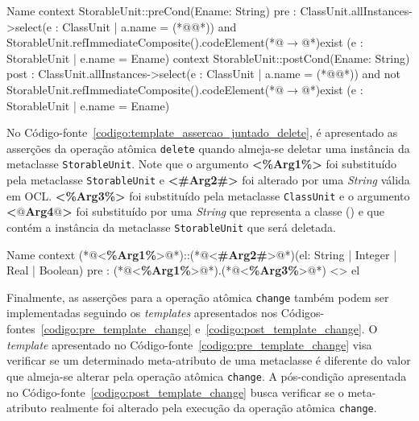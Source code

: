 \begin{codigo}[caption={[Asserções em OCL para realizar a operação atômica \texttt{delete}.] Asserções em OCL para realizar a operação atômica \texttt{delete}.},escapeinside={(*@}{@*)}, basicstyle=\footnotesize, label={codigo:template_assercao_juntado_delete}, language=OCL]{Name}
context StorableUnit::preCond(Ename: String)
pre : ClassUnit.allInstances->select(e : ClassUnit | a.name = (*@@*)) and StorableUnit.refImmediateComposite().codeElement(*@$\rightarrow$@*)exist (e : StorableUnit | e.name = Ename)
context StorableUnit::postCond(Ename: String)
post : ClassUnit.allInstances->select(e : ClassUnit | a.name = (*@@*)) and  not StorableUnit.refImmediateComposite().codeElement(*@$\rightarrow$@*)exist (e : StorableUnit | e.name = Ename)
\end{codigo}

No Código-fonte~\ref{codigo:template_assercao_juntado_delete}, é apresentado as asserções da operação atômica \texttt{delete} quando almeja-se deletar uma instância da metaclasse \texttt{StorableUnit}. Note que o argumento \textbf{<\%Arg1\%>} foi substituído pela metaclasse \texttt{StorableUnit} e \textbf{<\#Arg2\#>} foi alterado por uma \textit{String} válida em OCL. \textbf{<\%Arg3\%>} foi substituído pela metaclasse \texttt{ClassUnit} e o argumento \textbf{<$@$Arg4$@$>} foi  substituído por uma \textit{String} que representa a classe () e que contém a instância da metaclasse \texttt{StorableUnit} que será deletada. 

\begin{codigo}[caption={[\textit{Template} OCL para realizar a pré-condição da operação atômica \texttt{change}.] \textit{Template} OCL para realizar a pré-condição da operação atômica \texttt{change}.},escapeinside={(*@}{@*)}, mathescape=true, basicstyle=\footnotesize, label={codigo:pre_template_change}, language=OCL]{Name}
context (*@<\textbf{\%Arg1\%}>@*)::(*@<\textbf{\#Arg2\#}>@*)(el: String | Integer | Real | Boolean)
pre : (*@<\textbf{\%Arg1\%}>@*).(*@<\textbf{\%Arg3\%}>@*) <> el
\end{codigo}

Finalmente, as asserções para a operação atômica \texttt{change} também podem ser implementadas seguindo os \textit{templates} apresentados nos Códigos-fontes~\ref{codigo:pre_template_change} e~\ref{codigo:post_template_change}. O \textit{template} apresentado no Código-fonte~\ref{codigo:pre_template_change} visa verificar se um determinado meta-atributo de uma metaclasse é diferente do valor que almeja-se alterar pela operação atômica \texttt{change}. A pós-condição apresentada no Código-fonte~\ref{codigo:post_template_change} busca verificar se o meta-atributo realmente foi alterado pela execução da operação atômica \texttt{change}.

